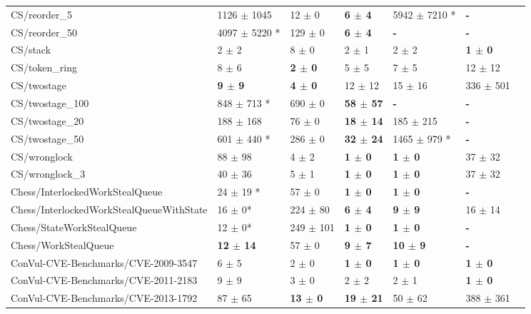 \begin{table}
\begin{spacing}{1.5}
\begin{tabular}{lllllll}
CS/reorder\_5 & 1126  $\pm$ 1045  & 12  $\pm$ 0  & \textbf{ 6  $\pm$ 4  } & 5942  $\pm$ 7210 * & \textbf{ - }  \\
CS/reorder\_50 & 4097  $\pm$ 5220 * & 129  $\pm$ 0  & \textbf{ 6  $\pm$ 4  } & \textbf{ - } & \textbf{ - }  \\
CS/stack & 2  $\pm$ 2  & 8  $\pm$ 0  & 2  $\pm$ 1  & 2  $\pm$ 2  & \textbf{ 1  $\pm$ 0  } \\
CS/token\_ring & 8  $\pm$ 6  & \textbf{ 2  $\pm$ 0  } & 5  $\pm$ 5  & 7  $\pm$ 5  & 12  $\pm$ 12   \\
CS/twostage & \textbf{ 9  $\pm$ 9  } & \textbf{ 4  $\pm$ 0  } & 12  $\pm$ 12  & 15  $\pm$ 16  & 336  $\pm$ 501   \\
CS/twostage\_100 & 848  $\pm$ 713 * & 690  $\pm$ 0  & \textbf{ 58  $\pm$ 57  } & \textbf{ - } & \textbf{ - }  \\
CS/twostage\_20 & 188  $\pm$ 168  & 76  $\pm$ 0  & \textbf{ 18  $\pm$ 14  } & 185  $\pm$ 215  & \textbf{ - }  \\
CS/twostage\_50 & 601  $\pm$ 440 * & 286  $\pm$ 0  & \textbf{ 32  $\pm$ 24  } & 1465  $\pm$ 979 * & \textbf{ - }  \\
CS/wronglock & 88  $\pm$ 98  & 4  $\pm$ 2  & \textbf{ 1  $\pm$ 0  } & \textbf{ 1  $\pm$ 0  } & 37  $\pm$ 32  \\
CS/wronglock\_3 & 40  $\pm$ 36  & 5  $\pm$ 1  & \textbf{ 1  $\pm$ 0  } & \textbf{ 1  $\pm$ 0  } & 37  $\pm$ 32   \\
Chess/InterlockedWorkStealQueue & 24  $\pm$ 19 * & 57  $\pm$ 0  & \textbf{ 1  $\pm$ 0  } & \textbf{ 1  $\pm$ 0  } & \textbf{ - }  \\
Chess/InterlockedWorkStealQueueWithState & 16  $\pm$ 0* & 224  $\pm$ 80  & \textbf{ 6  $\pm$ 4  } & \textbf{ 9  $\pm$ 9  } & 16  $\pm$ 14   \\
Chess/StateWorkStealQueue & 12  $\pm$ 0* & 249  $\pm$ 101  & \textbf{ 1  $\pm$ 0  } & \textbf{ 1  $\pm$ 0  } & \textbf{ - }  \\
Chess/WorkStealQueue & \textbf{ 12  $\pm$ 14  } & 57  $\pm$ 0  & \textbf{ 9  $\pm$ 7  } & \textbf{ 10  $\pm$ 9  } & \textbf{ - } \\
ConVul-CVE-Benchmarks/CVE-2009-3547 & 6  $\pm$ 5  & 2  $\pm$ 0  & \textbf{ 1  $\pm$ 0  } & \textbf{ 1  $\pm$ 0  } & \textbf{ 1  $\pm$ 0  } \\
ConVul-CVE-Benchmarks/CVE-2011-2183 & 9  $\pm$ 9  & 3  $\pm$ 0  & 2  $\pm$ 2  & 2  $\pm$ 1  & \textbf{ 1  $\pm$ 0  } \\
ConVul-CVE-Benchmarks/CVE-2013-1792 & 87  $\pm$ 65  & \textbf{ 13  $\pm$ 0  } & \textbf{ 19  $\pm$ 21  } & 50  $\pm$ 62  & 388  $\pm$ 361  \\

\end{tabular}
\end{spacing}
\end{table}
